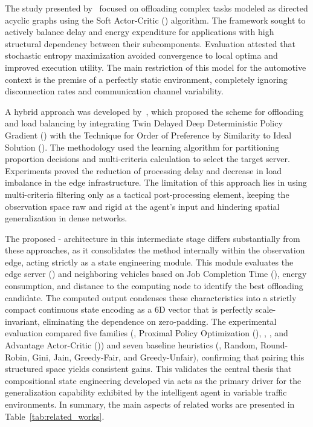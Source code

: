 The study presented by~\cite{liu2024} focused on offloading complex tasks modeled as directed acyclic graphs using the Soft Actor-Critic () algorithm. The framework sought to actively balance delay and energy expenditure for applications with high structural dependency between their subcomponents. Evaluation attested that stochastic entropy maximization avoided convergence to local optima and improved execution utility. The main restriction of this model for the automotive context is the premise of a perfectly static environment, completely ignoring disconnection rates and communication channel variability.

A hybrid approach was developed by~\cite{wu2024}, which proposed the  scheme for offloading and load balancing by integrating Twin Delayed Deep Deterministic Policy Gradient () with the Technique for Order of Preference by Similarity to Ideal Solution (). The methodology used the learning algorithm for partitioning proportion decisions and multi-criteria calculation to select the target server. Experiments proved the reduction of processing delay and decrease in load imbalance in the edge infrastructure. The limitation of this approach lies in using multi-criteria filtering only as a tactical post-processing element, keeping the observation space raw and rigid at the agent's input and hindering spatial generalization in dense networks.

The proposed - architecture in this intermediate stage differs substantially from these approaches, as it consolidates the  method internally within the observation edge, acting strictly as a state engineering module. This module evaluates the edge server () and neighboring vehicles based on Job Completion Time (), energy consumption, and distance to the computing node to identify the best offloading candidate. The computed output condenses these characteristics into a strictly compact continuous state encoding as a 6D vector that is perfectly scale-invariant, eliminating the dependence on zero-padding. The experimental evaluation compared five  families (, Proximal Policy Optimization (), , , and Advantage Actor-Critic ()) and seven baseline heuristics (, Random, Round-Robin, Gini, Jain, Greedy-Fair, and Greedy-Unfair), confirming that pairing this structured space yields consistent gains. This validates the central thesis that compositional state engineering developed via  acts as the primary driver for the generalization capability exhibited by the intelligent agent in variable traffic environments. In summary, the main aspects of related works are presented in Table~\ref{tab:related_works}.

